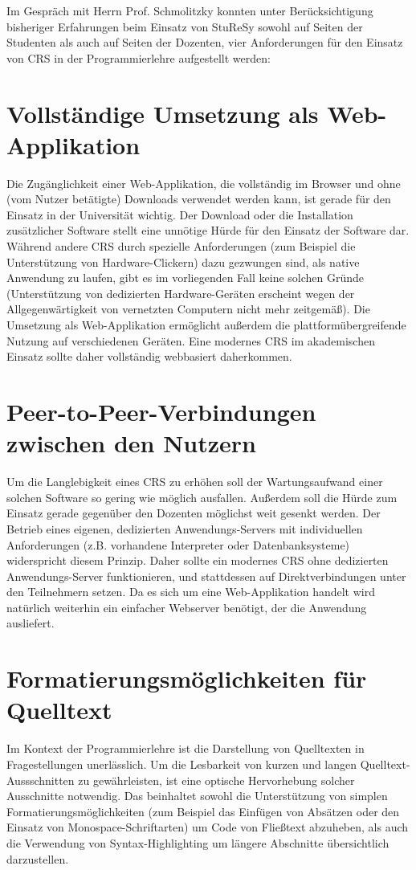 Im Gespräch mit Herrn Prof. Schmolitzky konnten unter Berücksichtigung bisheriger Erfahrungen beim Einsatz von StuReSy sowohl auf Seiten der Studenten als auch auf Seiten der Dozenten, vier Anforderungen für den Einsatz von CRS in der Programmierlehre aufgestellt werden:

\section{Vollständige Umsetzung als Web-Applikation}
\label{chap:webbasiert}
Die Zugänglichkeit einer Web-Applikation, die vollständig im Browser und ohne (vom Nutzer betätigte) Downloads verwendet werden kann, ist gerade für den Einsatz in der Universität wichtig. Der Download oder die Installation zusätzlicher Software stellt eine unnötige Hürde für den Einsatz der Software dar. Während andere CRS durch spezielle Anforderungen (zum Beispiel die Unterstützung von Hardware-Clickern) dazu gezwungen sind, als native Anwendung zu laufen, gibt es im vorliegenden Fall keine solchen Gründe (Unterstützung von dedizierten Hardware-Geräten erscheint wegen der Allgegenwärtigkeit von vernetzten Computern nicht mehr zeitgemäß). Die Umsetzung als Web-Applikation ermöglicht außerdem die plattformübergreifende Nutzung auf verschiedenen Geräten. Eine modernes CRS im akademischen Einsatz sollte daher vollständig webbasiert daherkommen.

\section{Peer-to-Peer-Verbindungen zwischen den Nutzern}
\label{chap:anforderung_p2p}
Um die Langlebigkeit eines CRS zu erhöhen soll der Wartungsaufwand einer solchen Software so gering wie möglich ausfallen. Außerdem soll die Hürde zum Einsatz gerade gegenüber den Dozenten möglichst weit gesenkt werden. Der Betrieb eines eigenen, dedizierten Anwendungs-Servers mit individuellen Anforderungen (z.B. vorhandene Interpreter oder Datenbanksysteme) widerspricht diesem Prinzip. Daher sollte ein modernes CRS ohne dedizierten Anwendungs-Server funktionieren, und stattdessen auf Direktverbindungen unter den Teilnehmern setzen. Da es sich um eine Web-Applikation handelt wird natürlich weiterhin ein einfacher Webserver benötigt, der die Anwendung ausliefert.

\section{Formatierungsmöglichkeiten für Quelltext}
\label{chap:codeformatierung}
Im Kontext der Programmierlehre ist die Darstellung von Quelltexten in Fragestellungen unerlässlich. Um die Lesbarkeit von kurzen und langen Quelltext-Aussschnitten zu gewährleisten, ist eine optische Hervorhebung solcher Ausschnitte notwendig. 
Das beinhaltet sowohl die Unterstützung von simplen Formatierungsmöglichkeiten (zum Beispiel das Einfügen von Absätzen oder den Einsatz von Monospace-Schriftarten) um Code von Fließtext abzuheben, als auch die Verwendung von Syntax-Highlighting um längere Abschnitte übersichtlich darzustellen. 

